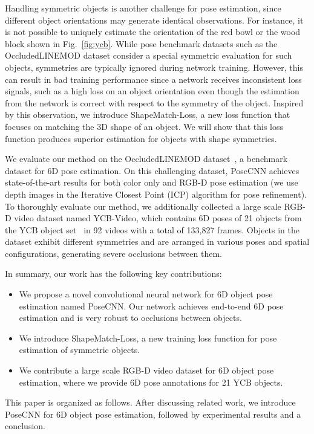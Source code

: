 \documentclass[conference]{IEEEtran}
\begin{document}
Handling symmetric objects is another challenge for pose estimation, since different object orientations may generate identical observations. For instance, it is not possible to uniquely estimate the orientation of the red bowl or the wood block shown in Fig.~\ref{fig:ycb}. While pose benchmark datasets such as the OccludedLINEMOD dataset \cite{krull2015learning} consider a special symmetric evaluation for such objects, symmetries are typically ignored during network training. However, this can result in bad training performance since a network receives inconsistent loss signals, such as a high loss on an object orientation even though the estimation from the network is correct with respect to the symmetry of the object. Inspired by this observation, we introduce ShapeMatch-Loss, a new loss function that focuses on matching the 3D shape of an object. We will show that this loss function produces superior estimation for objects with shape symmetries.

We evaluate our method on the OccludedLINEMOD dataset~\cite{krull2015learning}, a benchmark dataset for 6D pose estimation.  On this challenging dataset, PoseCNN achieves state-of-the-art results for both color only  and RGB-D pose estimation (we use depth images in the Iterative Closest Point (ICP) algorithm for pose refinement). To thoroughly evaluate our method, we additionally collected a large scale RGB-D video dataset named YCB-Video, which contains 6D poses of 21 objects from the YCB object set~\cite{calli2015ycb} in 92 videos with a total of 133,827 frames. Objects in the dataset exhibit different symmetries and are arranged in various poses and spatial configurations, generating severe occlusions between them.


In summary, our work has the following key contributions:
\begin{itemize}
    \item We propose a novel convolutional neural network for 6D object pose estimation named PoseCNN. Our network achieves end-to-end 6D pose estimation and is very robust to occlusions between objects.
    \item We introduce ShapeMatch-Loss, a new training loss function for pose estimation of symmetric objects.
    \item We contribute a large scale RGB-D video dataset for 6D object pose estimation, where we provide 6D pose annotations for 21 YCB objects.
\end{itemize}

\noindent This paper is organized as follows. After discussing related work, we introduce PoseCNN for 6D object pose estimation, followed by experimental results and a conclusion.
\end{document}
